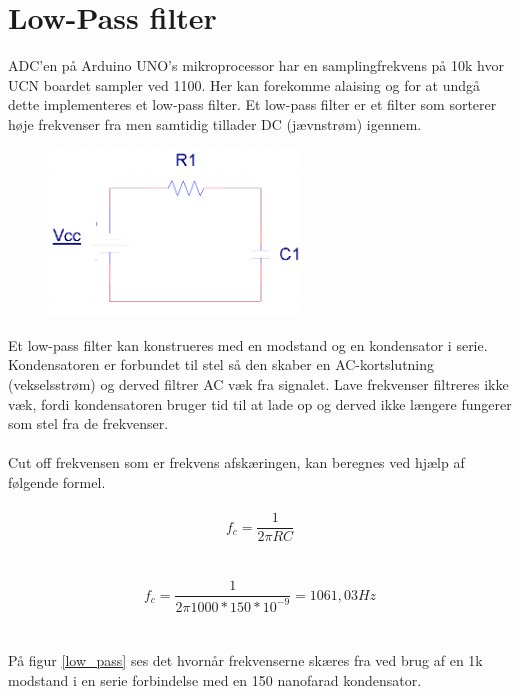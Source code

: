 \section{Low-Pass filter}
\label{lowPassFilter}
ADC'en på Arduino UNO's mikroprocessor har en samplingfrekvens på 10k hvor UCN boardet sampler ved 1100. Her kan forekomme alaising og for at undgå dette implementeres et low-pass filter. Et low-pass filter er et filter som sorterer høje frekvenser fra men samtidig tillader DC (jævnstrøm) igennem.


\begin{figure}[h!]
  \centering
  \includegraphics[width=0.6\textwidth]{figures/low_pass_schematic.png}
\end{figure}

Et low-pass filter kan konstrueres med en modstand og en kondensator i serie. Kondensatoren er forbundet til stel så den skaber en AC-kortslutning (vekselsstrøm) og derved filtrer AC væk fra signalet. 
Lave frekvenser filtreres ikke væk, fordi kondensatoren bruger tid til at lade op og derved ikke længere fungerer som stel fra de frekvenser.
\\
\\
Cut off frekvensen som er frekvens afskæringen, kan beregnes ved hjælp af følgende formel. 
\\
\\
\begin{equation}
f_{c}=\frac{1}{2\pi R C }
\label{lowPassEquation}
\end{equation}
\\
\\
\begin{equation}
f_{c}=\frac{1}{2\pi 1000 * 150*10^{-9}} = 1061,03 Hz
\label{lowPassEquation}
\end{equation}
\\
\\
På figur \ref{low_pass} ses det hvornår frekvenserne skæres fra ved brug af en 1k modstand i en serie forbindelse med en 150 nanofarad kondensator. 

